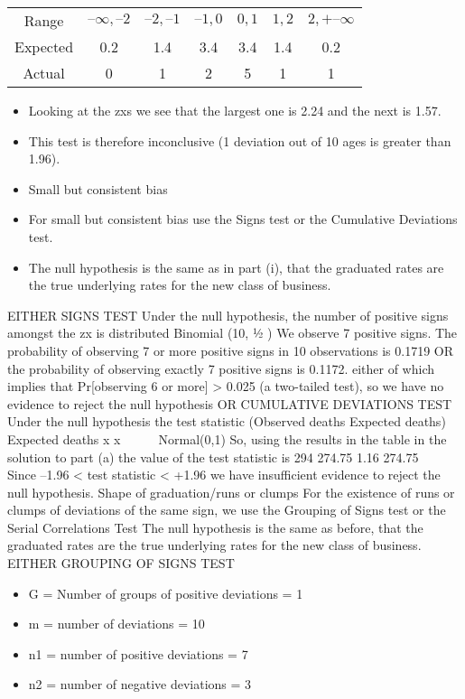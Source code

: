 \documentclass[a4paper,12pt]{article}
\begin{document}
\begin{center}
\begin{tabular}{ccccccc}
Range  & $–\infty,–2 $ & $  –2,–1 $ & $ –1,0$ & $ 0,1 $ & $1,2 $ & $2,+–\infty$ \\
Expected & 0.2 & 1.4 & 3.4 & 3.4 & 1.4 & 0.2 \\
Actual & 0 & 1 & 2 & 5 & 1 & 1\\
\end{tabular}
\end{center}

\begin{itemize}
    \item Looking at the zxs we see that the largest one is 2.24 and the next is 1.57.
\item This test is therefore inconclusive (1 deviation out of 10 ages is greater
than 1.96).
\item Small but consistent bias
\item For small but consistent bias use the Signs test or the Cumulative Deviations
test.
\item The null hypothesis is the same as in part (i), that the graduated rates are the
true underlying rates for the new class of business.
\end{itemize}

EITHER SIGNS TEST
Under the null hypothesis, the number of positive signs amongst the zx is
distributed Binomial (10, ½ )
We observe 7 positive signs.
The probability of observing 7 or more positive signs in 10 observations is
0.1719
OR
the probability of observing exactly 7 positive signs is 0.1172.
either of which implies that Pr[observing 6 or more] > 0.025 (a two-tailed
test),
so we have no evidence to reject the null hypothesis
OR CUMULATIVE DEVIATIONS TEST
Under the null hypothesis
the test statistic
(Observed deaths Expected deaths)
Expected deaths
x
x
 

~ Normal(0,1)
So, using the results in the table in the solution to part (a) the value of the test
statistic is
294 274.75 1.16
274.75


Since –1.96 < test statistic < +1.96
we have insufficient evidence to reject the null hypothesis.
Shape of graduation/runs or clumps
For the existence of runs or clumps of deviations of the same sign, we use the
Grouping of Signs test or the Serial Correlations Test
The null hypothesis is the same as before, that the graduated rates are the true
underlying rates for the new class of business.
EITHER GROUPING OF SIGNS TEST
\begin{itemize}
    \item G = Number of groups of positive deviations = 1
    \item m = number of deviations = 10
    \item n1 = number of positive deviations = 7
    \item n2 = number of negative deviations = 3
\end{itemize}
\end{document}
